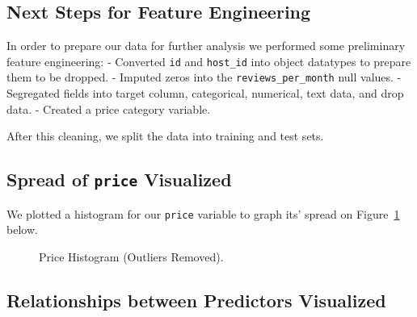 \documentclass[
  letterpaper,
  DIV=11,
  numbers=noendperiod]{scrartcl}
\begin{document}
\subsection{Next Steps for Feature
Engineering}\label{next-steps-for-feature-engineering}

In order to prepare our data for further analysis we performed some
preliminary feature engineering: - Converted \texttt{id} and
\texttt{host\_id} into object datatypes to prepare them to be dropped. -
Imputed zeros into the \texttt{reviews\_per\_month} null values. -
Segregated fields into target column, categorical, numerical, text data,
and drop data. - Created a price category variable.

After this cleaning, we split the data into training and test sets.

\subsection{\texorpdfstring{Spread of \texttt{price}
Visualized}{Spread of price Visualized}}\label{spread-of-price-visualized}

We plotted a histogram for our \texttt{price} variable to graph its'
spread on Figure~\ref{fig-price-plot} below.

\begin{figure}[H]


\caption{\label{fig-price-plot}Price Histogram (Outliers Removed).}

\end{figure}%

\subsection{Relationships between Predictors
Visualized}\label{relationships-between-predictors-visualized}
\end{document}
